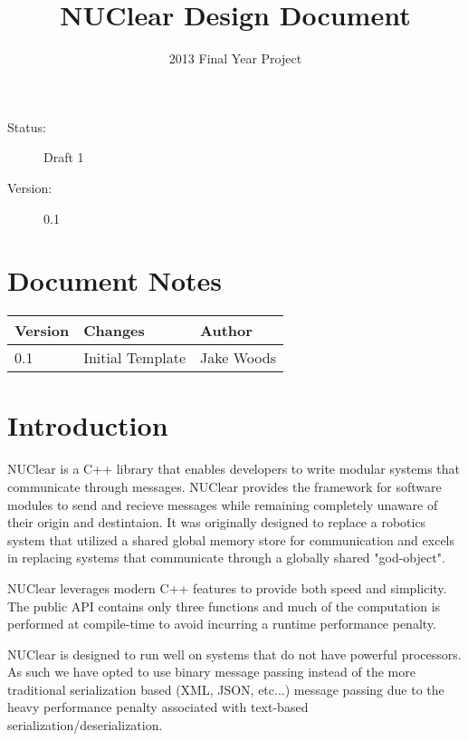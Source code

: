 \documentclass[english,12pt]{scrartcl}
\title{NUClear Design Document}
\author{2013 Final Year Project}
\begin{document}
	\maketitle
	\vfill
	{\large
		\begin{description}
			\item [Status:] Draft 1
			\item [Version:] 0.1
		\end{description}}

	\clearpage
	\tableofcontents

	\section{Document Notes}
		\begin{tabular}{ p{} | p{} | p{} }
			\textbf{Version} & \textbf{Changes} & \textbf{Author} \\
			\hline

			0.1 &
			Initial Template &
			Jake Woods \\
			\hline
		\end{tabular}
		
	\clearpage
		
	\section{Introduction}
        NUClear is a C++ library that enables developers to write modular systems that communicate through messages. 
        NUClear provides the framework for software modules to send and recieve messages while remaining completely unaware of their origin and destintaion.
        It was originally designed to replace a robotics system that utilized a shared global memory store for communication and excels in replacing systems
        that communicate through a globally shared "god-object".

        NUClear leverages modern C++ features to provide both speed and simplicity. 
        The public API contains only three functions and much of the computation is performed at compile-time to avoid incurring a runtime performance penalty.

        NUClear is designed to run well on systems that do not have powerful processors. As such we have opted to use binary message passing instead of the more
        traditional serialization based (XML, JSON, etc...) message passing due to the heavy performance penalty associated with text-based serialization/deserialization.
\end{document}
